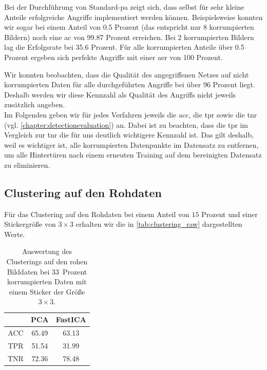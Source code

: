 \documentclass[twoside, 12pt,a4paper]{book}
\numberwithin{equation}{section}
\begin{document}
	\noindent Bei der Durchführung von Standard-\ac{pa} zeigt sich, dass selbst für sehr kleine Anteile erfolgreiche Angriffe implementiert werden können. Beispielsweise konnten wir sogar bei einem Anteil von 0.5 Prozent (das entspricht nur 8 korrumpierten Bildern) noch eine \ac{ac} von 99.87 Prozent erreichen. Bei 2 korrumpierten Bildern lag die Erfolgsrate bei 35.6 Prozent. Für alle korrumpierten Anteile über 0.5 Prozent ergeben sich perfekte Angriffe mit einer \ac{aer} von 100 Prozent.
	
	\noindent Wir konnten beobachten, dass die Qualität des angegriffenen Netzes auf nicht korrumpierten Daten für alle durchgeführten Angriffe bei über 96 Prozent liegt. Deshalb werden wir diese Kennzahl als Qualität des Angriffs nicht jeweils zusätzlich angeben.\\
	
	\noindent Im Folgenden geben wir für jedes Verfahren jeweils die \ac{acc}, die \ac{tpr} sowie die \ac{tnr} (vgl. \autoref{chapter:detectionevaluation}) an. Dabei ist zu beachten, dass die \ac{tpr} im Vergleich zur \ac{tnr} die für uns deutlich wichtigere Kennzahl ist. Das gilt deshalb, weil es wichtiger ist, alle korrumpierten Datenpunkte im Datensatz zu entfernen, um alle Hintertüren nach einem erneuten Training auf dem bereinigten Datensatz zu eliminieren. 
	
	
	\subsection{Clustering auf den Rohdaten}
	Für das Clustering auf den Rohdaten bei einem Anteil von $15$ Prozent und einer Stickergröße von $3 \times 3$ erhalten wir die in \autoref{tab:clustering_raw} dargestellten Werte. 
	\begin{table}[ht]	
		\caption[Auswertung des Clusterings direkt auf den Bilddaten]{Auswertung des Clusterings auf den rohen Bilddaten bei 33~Prozent korrumpierten Daten mit einem Sticker der Größe $3 \times 3$.}	
		\label{tab:clustering_raw}
		\begin{center}
				\begin{tabular}{|c|c|c|} \hline
					& PCA & FastICA \\ \hline
					ACC	 & 	65.49 & 63.13 \\
					TPR		& 51.54 & 31.99 \\
					TNR	& 72.36 	&78.48 	\\ \hline
				\end{tabular}
			
			
			
		\end{center}
	\end{table}
\end{document}
